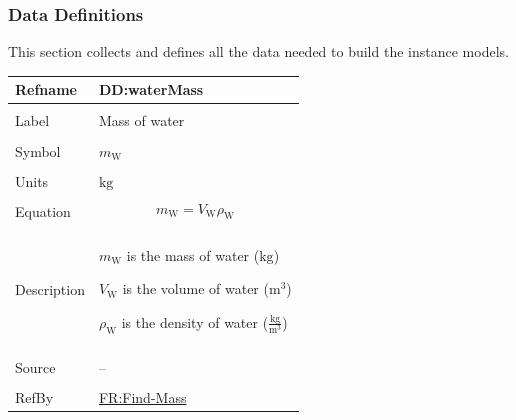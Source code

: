 \documentclass[12pt]{article}
\begin{document}
\subsubsection{Data Definitions}
\label{Sec:DDs}
This section collects and defines all the data needed to build the instance models.

\vspace{\baselineskip}
\noindent
\begin{minipage}{\textwidth}
\begin{tabular}{>{\raggedright}p{}>{\raggedright\arraybackslash}p{}}
\toprule \textbf{Refname} & \textbf{DD:waterMass}
\label{DD:waterMass}
\\ \midrule \\
Label & Mass of water
        
\\ \midrule \\
Symbol & ${m_{\text{W}}}$
         
\\ \midrule \\
Units & ${\text{kg}}$
        
\\ \midrule \\
Equation & \begin{displaymath}
           {m_{\text{W}}}={V_{\text{W}}} {ρ_{\text{W}}}
           \end{displaymath}
\\ \midrule \\
Description & \begin{symbDescription}
              \item{${m_{\text{W}}}$ is the mass of water (${\text{kg}}$)}
              \item{${V_{\text{W}}}$ is the volume of water (${\text{m}^{3}}$)}
              \item{${ρ_{\text{W}}}$ is the density of water ($\frac{\text{kg}}{\text{m}^{3}}$)}
              \end{symbDescription}
\\ \midrule \\
Source & --
         
\\ \midrule \\
RefBy & \hyperref[findMass]{FR:Find-Mass}
        
\\ \bottomrule
\end{tabular}
\end{minipage}
\end{document}
